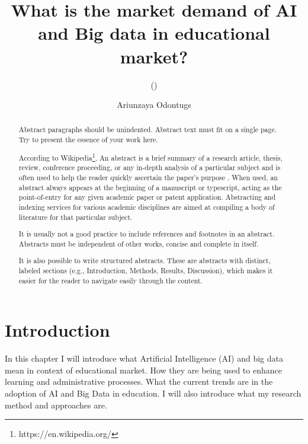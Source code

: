 \documentclass{imc-inf}
\title{What is the market demand of AI and Big data in educational market?}
\subtitle{()}
\author{Ariunzaya Odontugs}
\begin{document}
\frontmatter\maketitle{}


\begin{declarations}\end{declarations}



\begin{abstract}
	Abstract paragraphs should be unindented. Abstract text must fit on a single page. Try to present the essence of your work here. 
	
	According to Wikipedia\footnote{https://en.wikipedia.org/}, An abstract is a brief summary of a research article, thesis, review, conference proceeding, or any in-depth analysis of a particular subject and is often used to help the reader quickly ascertain the paper's purpose \cite{988366}. When used, an abstract always appears at the beginning of a manuscript or typescript, acting as the point-of-entry for any given academic paper or patent application. Abstracting and indexing services for various academic disciplines are aimed at compiling a body of literature for that particular subject.
	
	It is usually not a good practice to include references and footnotes in an abstract. Abstracts must be independent of other works, concise and complete in itself. 
	
	It is also possible to write structured abstracts. These are abstracts with distinct, labeled sections (e.g., Introduction, Methods, Results, Discussion), which makes it easier for the reader to navigate easily through the content. 
	
\end{abstract}


%
\tableofcontents%
\clearpage


%
\listoftables
\clearpage


%
\listoffigures
\clearpage


\mainmatter%

\chapter{Introduction}\label{chap:introduction}

In this chapter I will introduce what Artificial Intelligence (AI) and big data mean in context of educational market. How they are being used to enhance learning and administrative processes. What the current trends are in the adoption of AI and Big Data in education. I will also introduce what my research method and approaches are. 
\end{document}

